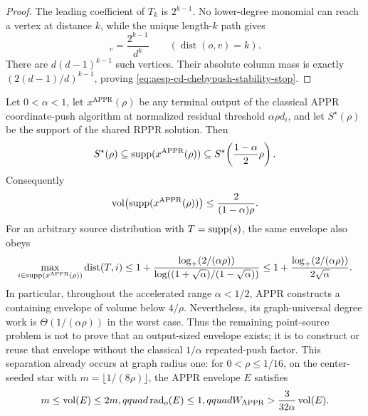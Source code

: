 \begin{proof}
The leading coefficient of \(T_k\) is \(2^{k-1}\).  No lower-degree monomial
can reach a vertex at distance \(k\), while the unique length-\(k\) path gives
\begin{equation*}
 [T_k(P)e_o]_v=\frac{2^{k-1}}{d^k}
 \qquad(\operatorname{dist}(o,v)=k).
\end{equation*}
There are \(d(d-1)^{k-1}\) such vertices.  Their absolute column mass is
exactly \((2(d-1)/d)^{k-1}\), proving
\cref{eq:aesp-cd-chebypush-stability-stop}.
\end{proof}

\begin{proposition}
\label{prop:aesp-cd-point-source-appr-envelope}
Let \(0<\alpha<1\), let \(x^{\mathrm{APPR}}(\rho)\) be any terminal output of
the classical APPR coordinate-push algorithm at normalized residual threshold
\(\alpha\rho d_i\), and let \(S^\star(\rho)\) be the support of the shared
RPPR solution.  Then
\begin{equation}
 S^\star(\rho)
 \subseteq \operatorname{supp}(x^{\mathrm{APPR}}(\rho))
 \subseteq S^\star\!\left(\frac{1-\alpha}{2}\rho\right).
 \label{eq:aesp-cd-point-source-appr-envelope}
\end{equation}
Consequently
\begin{equation}
 \operatorname{vol}\bigl(\operatorname{supp}(x^{\mathrm{APPR}}(\rho))\bigr)
 \leq \frac{2}{(1-\alpha)\rho}.
 \label{eq:aesp-cd-point-source-appr-envelope-volume}
\end{equation}
For an arbitrary source distribution with $T=\operatorname{supp}(s)$, the same envelope
also obeys
\begin{equation}
 \max_{i\in\operatorname{supp}(x^{\mathrm{APPR}}(\rho))}\operatorname{dist}(T,i)
 \leq1+
 \frac{\log_+(2/(\alpha\rho))}
 {\log((1+\sqrt\alpha)/(1-\sqrt\alpha))}
 \leq1+\frac{\log_+(2/(\alpha\rho))}{2\sqrt\alpha}.
 \label{eq:aesp-cd-point-source-appr-envelope-radius}
\end{equation}
In particular, throughout the accelerated range \(\alpha<1/2\), APPR
constructs a containing envelope of volume below \(4/\rho\).  Nevertheless,
its graph-universal degree work is
\(\Theta(1/(\alpha\rho))\) in the worst case.  Thus the remaining
point-source problem is not to prove that an output-sized envelope exists;
it is to construct or reuse that envelope without the classical
\(1/\alpha\) repeated-push factor.  This separation already occurs at graph
radius one: for \(0<\rho\leq1/16\), on the center-seeded star with
\(m=\lfloor1/(8\rho)\rfloor\), the APPR envelope \(E\) satisfies
\begin{equation}
 m\leq\operatorname{vol}(E)\leq2m,qquad
 \operatorname{rad}_o(E)\leq1,qquad
 W_{\mathrm{APPR}}>
 \frac{3}{32\alpha}\operatorname{vol}(E).
 \label{eq:aesp-cd-point-source-appr-envelope-reuse-gap}
\end{equation}
\end{proposition}

